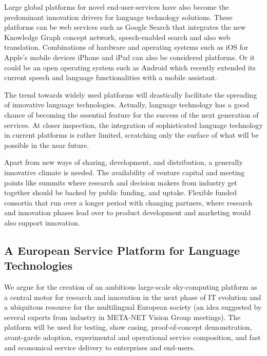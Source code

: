 \documentclass[10pt, plain]{../../metanetpaper}
\begin{document}
\begin{multicols}{2}
Large global platforms for novel end-user-services have also become the predominant innovation drivers for language technology solutions. These platforms can be web services such as Google Search that integrates the new Knowledge Graph concept network, speech-enabled search and also web translation. Combinations of hardware and operating systems such as iOS for Apple's mobile devices iPhone and iPad can also be considered platforms. Or it could be an open operating system such as Android which recently extended its current speech and language functionalities with a mobile assistant.

The trend towards widely used platforms will drastically facilitate the spreading of innovative language technologies. Actually, language technology has a good chance of becoming the essential feature for the success of the next generation of services. At closer inspection, the integration of sophisticated language technology in current platforms is rather limited, scratching only the surface of what will be possible in the near future.

Apart from new ways of sharing, development, and distribution, a generally innovative climate is needed. The availability of venture capital and meeting points like summits where research and decision makers from industry get together should be backed by public funding, and uptake. Flexible funded consortia that run over a longer period with changing partners, where research and innovation phases lead over to product development and marketing would also support innovation.

\subsection{A European Service Platform for Language Technologies}
\label{sec:europ-service-platform}

%

We argue for the creation of an ambitious large-scale sky-computing platform as a central motor for research and innovation in the next phase of IT evolution and a ubiquitous resource for the multilingual European society (an idea suggested by several experts from industry in META-NET Vision Group meetings). The platform will be used for testing, show casing, proof-of-concept demonstration, avant-garde adoption, experimental and operational service composition, and fast and economical service delivery to enterprises and end-users.
 

\end{multicols}
\end{document}
